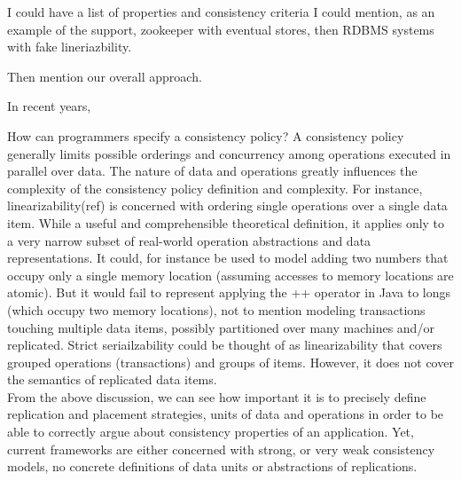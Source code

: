 I could have a list of properties and consistency criteria
I could mention, as an example of the support, zookeeper with eventual stores,
then RDBMS systems with fake lineriazbility.

Then mention our overall approach.


In recent years, 

How can programmers specify a consistency policy? 
A consistency policy generally limits possible orderings and concurrency among
operations executed in parallel over data. The nature of data and operations
greatly influences the complexity of the consistency policy definition and
complexity. For instance, linearizability(ref) is concerned with ordering single
operations over a single data item. While a useful and comprehensible theoretical
definition, it applies only to a very narrow subset of real-world operation
abstractions and data representations. It could, for instance be used to model adding
two numbers that occupy only a single memory location (assuming accesses to
memory locations are atomic). But it would fail to represent applying the ++
operator in Java to longs (which occupy two memory locations), not to mention
modeling transactions touching multiple data items, possibly partitioned over many
machines and/or replicated. Strict seriailzability could be thought of as
linearizability that covers grouped operations (transactions) and groups of
items. However, it does not cover the semantics of replicated data items.\\

From the above discussion, we can see how important it is to precisely define
replication and placement strategies, units of data and operations in order to
be able to correctly argue about consistency properties of an application. Yet,
current frameworks are either concerned with strong,
or very weak consistency models, no concrete definitions of data units or
abstractions of replications. 

